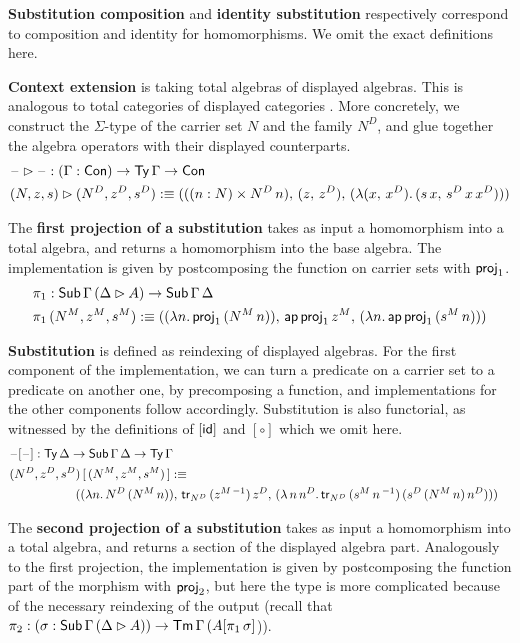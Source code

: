 \documentclass[acmsmall,screen]{acmart}
\begin{document}
\textbf{Substitution composition} and \textbf{identity substitution}
respectively correspond to composition and identity for
homomorphisms. We omit the exact definitions here.

\textbf{Context extension} is taking total algebras of displayed
algebras. This is analogous to total categories of displayed
categories \cite{displayedCategories}. More concretely, we construct
the $\Sigma$-type of the carrier set $N$ and the family $N^D$, and
glue together the algebra operators with their displayed counterparts.
\begin{alignat*}{5}
  & \mathord{\hspace{1pt}\text{--}\hspace{1pt}}\rhd \mathord{\hspace{1pt}\text{--}\hspace{1pt}} : (\Gamma : \mathsf{Con}) \rightarrow \mathsf{Ty}\,\Gamma \rightarrow \mathsf{Con} \\
  & (N, z, s) \rhd (N^D, z^D, s^D) :\equiv
  (((n : N) \times N^D\,n),\,(z,\,z^D),\,(\lambda (x,\,x^D).\,(s\,x,\,s^D\,x\,x^D)))
\end{alignat*}

The \textbf{first projection of a substitution} takes as input a
homomorphism into a total algebra, and returns a homomorphism into the
base algebra. The implementation is given by postcomposing the
function on carrier sets with $\mathsf{proj}_1$.
\begin{alignat*}{5}
  & \pi_1 : \mathsf{Sub}\,\Gamma\,(\Delta\rhd A)\rightarrow\mathsf{Sub}\,\Gamma\,\Delta \\
  & \pi_1\,(N^M, z^M, s^M) :\equiv ((\lambda n.\, \mathsf{proj}_1\,(N^M\,n)),\,\mathsf{ap}\,\mathsf{proj}_1\,z^M,\, (\lambda n.\,\mathsf{ap}\,\mathsf{proj}_1\,(s^M\,n)))
\end{alignat*}

\textbf{Substitution} is defined as reindexing of displayed
algebras. For the first component of the implementation, we can turn a
predicate on a carrier set to a predicate on another one, by
precomposing a function, and implementations for the other components
follow accordingly. Substitution is also functorial, as witnessed by
the definitions of $[\mathsf{id}]$ and $[\circ]$ which we omit here.
\begin{alignat*}{5}
  & \blank[\blank] : \Ty\,\Delta\ra\Tms\,\Gamma\,\Delta\ra\Ty\,\Gamma \\
  & (N^D, z^D, s^D)\,[\,(N^M, z^M, s^M)\,] :\equiv \\
  & && \hspace{-10em}
  ((\lambda n.\,N^D\,(N^M\,n)),\,\tr_{N^D}\,(z^{M\,-1})\,z^D,\,(\lambda\,n\,n^D.\,\tr_{N^D}\,(s^M\,n\,^{-1})\,(s^D\,(N^M\,n)\,n^D)))
\end{alignat*}

The \textbf{second projection of a substitution} takes as input a
homomorphism into a total algebra, and returns a section of the
displayed algebra part. Analogously to the first projection, the
implementation is given by postcomposing the function part of the
morphism with $\mathsf{proj}_2$, but here the type is more complicated because
of the necessary reindexing of the output (recall that $\pi_2 :
(\sigma:\mathsf{Sub}\,\Gamma\,(\Delta\rhd
A))\rightarrow\mathsf{Tm}\,\Gamma\,(A[\pi_1\,\sigma]$)).
\end{document}
